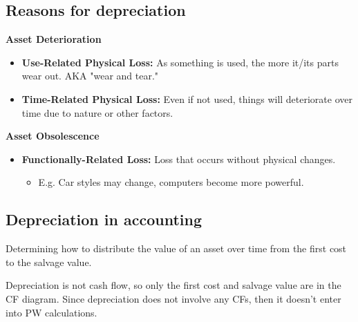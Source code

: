 \subsection{Reasons for depreciation}
\begin{definition}

    \textbf{Asset Deterioration}
        \begin{itemize}
            \item \textbf{Use-Related Physical Loss:} As something is used, the more it/its parts wear out. AKA "wear and tear."
            \item \textbf{Time-Related Physical Loss:} Even if not used, things will deteriorate over time due to nature or other factors.
        \end{itemize}
        
    \textbf{Asset Obsolescence}
        \begin{itemize}
            \item \textbf{Functionally-Related Loss:} Loss that occurs without physical changes.
            \begin{itemize}
                \item E.g. Car styles may change, computers become more powerful.
            \end{itemize}
        \end{itemize}
\end{definition}

\subsection{Depreciation in accounting}
\begin{intuition}
    Determining how to distribute the value of an asset over time from the first cost to the salvage value. 
\end{intuition}

\begin{warning}
    Depreciation is not cash flow, so only the first cost and salvage value are in the CF diagram. Since depreciation does not involve any CFs, then it doesn't enter into PW calculations.
\end{warning}

